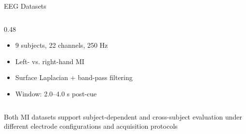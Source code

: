 \documentclass[aspectratio=169]{beamer}
\begin{document}
\begin{frame}{EEG Datasets}
\begin{columns}[T,totalwidth=\textwidth]
\begin{column}{0.48\textwidth}


\raggedright
\begin{itemize}\itemsep1pt
    \item 9 subjects, 22 channels, 250 Hz
    \item Left- vs. right-hand MI
    \item Surface Laplacian + band-pass filtering
    \item Window: 2.0--4.0 s post-cue
\end{itemize}

\end{column}

\end{columns}

\vfill
\vspace{0.3cm}
{\centering
\color{frameblue}
Both MI datasets support subject-dependent and cross-subject evaluation under different electrode configurations and acquisition protocols
\par}

\end{frame}
\end{document}
